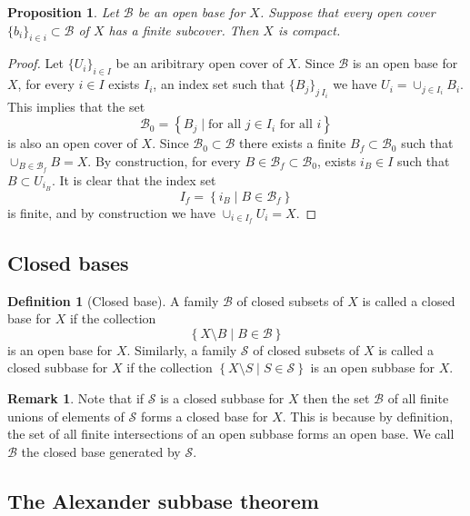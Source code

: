 \documentclass[11pt,a4paper]{article}
\theoremstyle{definition}
\newtheorem{definition}{Definition}[section]
\newtheorem{remark}{Remark}[section]
\theoremstyle{plain}
\newtheorem{proposition}[theorem]{Proposition}
\newcommand{\set}[2]{ \left\{ #1 \mid #2 \right\} }
\begin{document}
  \begin{proposition}
    Let $\mathcal B$ be an open base for $X$. Suppose that every open cover
    $\{b_i\}_{i \in i} \subset \mathcal B$ of $X$ has a finite subcover. 
    Then $X$ is compact.
  \end{proposition}
  \begin{proof}
    Let $\{U_i\}_{i \in I}$ be an aribitrary open cover of $X$. Since
    $\mathcal B$ is an open base for $X$, for every $i \in I$ exists
    $I_i$, an index set such that $\{B_j\}_{j \ I_i}$ we have
    $U_i = \cup_{j \in I_i} B_i$. This implies that the set
    \[
      \mathcal B_0 = \set{B_j}{\text{for all $j \in I_i$ for all $i$}}
    \]
    is also an open cover of $X$. Since $\mathcal B_0 \subset \mathcal B$
    there exists a finite $B_f \subset \mathcal B_0$ such that
    $\cup_{B \in \mathcal B_f} B = X$. By construction, for every
    $B \in \mathcal B_f \subset \mathcal B_0$, exists $i_B \in I$ such
    that $B \subset U_{i_B}$. It is clear that the index set
    \[
      I_f = \set{i_B}{B \in \mathcal B_f}
    \]
    is finite, and by construction we have $\cup_{i \in I_f} U_i = X$.
  \end{proof}

  \subsection{Closed bases}

  \begin{definition}[Closed base]
    A family $\mathcal{B}$ of closed subsets of $X$ is called a 
    closed base for $X$ if the collection
    \[
      \set{X \setminus B}{B \in \mathcal B}
    \]
    is an open base for $X$. Similarly, a family $\mathcal S$ of
    closed subsets of $X$ is called a closed subbase for $X$ 
    if the collection $\set{X \setminus S}{S \in \mathcal S}$ is 
    an open subbase for $X$.
  \end{definition}

  \begin{remark}
    Note that if $\mathcal S$ is a closed subbase for $X$ then the set 
    $\mathcal{B}$ of all finite unions of elements of $\mathcal S$ forms 
    a closed base for $X$. This is because by definition,
    the set of all finite intersections of an open subbase forms an open 
    base. We call $\mathcal B$ the closed base generated by 
    $\mathcal S$.
  \end{remark}

  \subsection{The Alexander subbase theorem}
\end{document}
